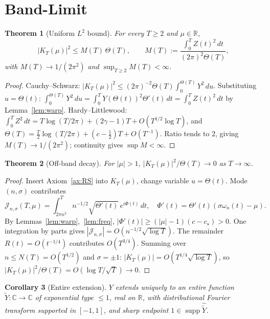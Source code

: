 \documentclass[11pt]{article}
\newtheorem{theorem}{Theorem}
\newtheorem{corollary}[theorem]{Corollary}
\theoremstyle{definition}
\newcommand{\R}{\mathbb{R}}
\newcommand{\C}{\mathbb{C}}
\newcommand{\supp}{\operatorname{supp}}
\begin{document}
\section{Band-Limit}

\begin{theorem}[Uniform \(L^2\) bound]\label{thm:L2}
For every \(T\ge 2\) and \(\mu\in\R\),
\[
|K_T(\mu)|^2\le M(T)\,\Theta(T),\qquad M(T):=\frac{\int_0^T Z(t)^2\,dt}{(2\pi)^2\Theta(T)},
\]
with \(M(T)\to 1/(2\pi^2)\) and \(\sup_{T\ge 2}M(T)<\infty\).
\end{theorem}

\begin{proof}
Cauchy--Schwarz: \(|K_T(\mu)|^2\le(2\pi)^{-2}\Theta(T)\int_0^{\Theta(T)}Y^2\,du\). Substituting \(u=\Theta(t)\): \(\int_0^{\Theta(T)}Y^2\,du=\int_0^T Y(\Theta(t))^2\Theta'(t)\,dt=\int_0^T Z(t)^2\,dt\) by Lemma~\ref{lem:warp}. Hardy--Littlewood: \(\int_0^T Z^2\,dt=T\log(T/2\pi)+(2\gamma-1)T+O(T^{1/2}\log T)\), and \(\Theta(T)=\tfrac{T}{2}\log(T/2\pi)+(c-\tfrac12)T+O(T^{-1})\). Ratio tends to \(2\), giving \(M(T)\to 1/(2\pi^2)\); continuity gives \(\sup M<\infty\).
\end{proof}

\begin{theorem}[Off-band decay]\label{thm:offband}
For \(|\mu|>1\), \(|K_T(\mu)|^2/\Theta(T)\to 0\) as \(T\to\infty\).
\end{theorem}

\begin{proof}
Insert Axiom~\ref{ax:RS} into \(K_T(\mu)\), change variable \(u=\Theta(t)\). Mode \((n,\sigma)\) contributes
\[
\mathcal J_{n,\sigma}(T,\mu)=\int_{2\pi n^2}^T n^{-1/2}\sqrt{\Theta'(t)}\,e^{i\Phi(t)}\,dt,\quad \Phi'(t)=\Theta'(t)(\sigma\omega_n(t)-\mu).
\]
By Lemmas~\ref{lem:warp},~\ref{lem:freq}, \(|\Phi'(t)|\ge(|\mu|-1)(c-c_\star)>0\). One integration by parts gives \(|\mathcal J_{n,\sigma}|=O(n^{-1/2}\sqrt{\log T})\). The remainder \(R(t)=O(t^{-1/4})\) contributes \(O(T^{3/4})\). Summing over \(n\le N(T)=O(T^{1/2})\) and \(\sigma=\pm 1\): \(|K_T(\mu)|=O(T^{1/4}\sqrt{\log T})\), so \(|K_T(\mu)|^2/\Theta(T)=O(\log T/\sqrt{T})\to 0\).
\end{proof}

\begin{corollary}[Entire extension]\label{cor:entire}
\(Y\) extends uniquely to an entire function \(\tilde Y:\C\to\C\) of exponential type \(\le 1\), real on \(\R\), with distributional Fourier transform supported in \([-1,1]\), and sharp endpoint \(1\in\supp\widehat{\tilde Y}\).
\end{corollary}
\end{document}
